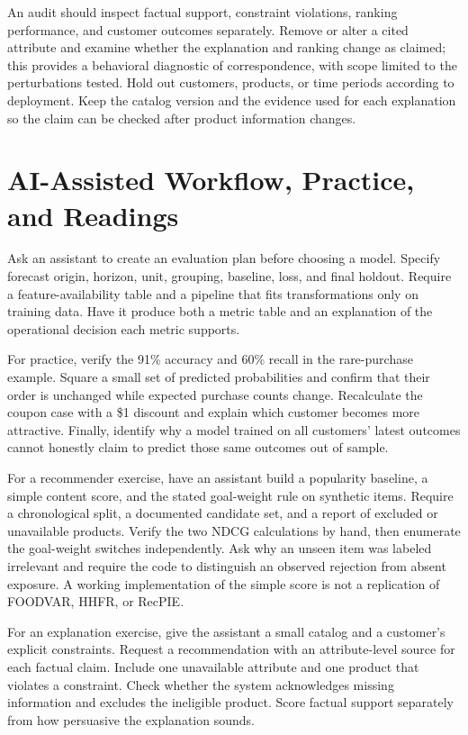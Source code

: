 An audit should inspect factual support, constraint violations, ranking
performance, and customer outcomes separately. Remove or alter a cited
attribute and examine whether the explanation and ranking change as
claimed; this provides a behavioral diagnostic of correspondence, with
scope limited to the perturbations tested. Hold out customers, products,
or time periods according to deployment. Keep the catalog version and
the evidence used for each explanation so the claim can be checked after
product information changes.

\hypertarget{M07-ai-assisted-workflow-practice-and-readings}{%
\section{AI-Assisted Workflow, Practice, and
Readings}\label{M07-ai-assisted-workflow-practice-and-readings}}

\noindent Ask an assistant to create an evaluation plan before choosing a model.
Specify forecast origin, horizon, unit, grouping, baseline, loss, and
final holdout. Require a feature-availability table and a pipeline that
fits transformations only on training data. Have it produce both a
metric table and an explanation of the operational decision each metric
supports.

For practice, verify the 91\% accuracy and 60\% recall in the
rare-purchase example. Square a small set of predicted probabilities and
confirm that their order is unchanged while expected purchase counts
change. Recalculate the coupon case with a \$1 discount and explain
which customer becomes more attractive. Finally, identify why a model
trained on all customers' latest outcomes cannot honestly claim to
predict those same outcomes out of sample.

For a recommender exercise, have an assistant build a popularity
baseline, a simple content score, and the stated goal-weight rule on
synthetic items. Require a chronological split, a documented candidate
set, and a report of excluded or unavailable products. Verify the two
NDCG calculations by hand, then enumerate the goal-weight switches
independently. Ask why an unseen item was labeled irrelevant and require
the code to distinguish an observed rejection from absent exposure. A
working implementation of the simple score is not a replication of
FOODVAR, HHFR, or RecPIE.

For an explanation exercise, give the assistant a small catalog and a
customer's explicit constraints. Request a recommendation with an
attribute-level source for each factual claim. Include one unavailable
attribute and one product that violates a constraint. Check whether the
system acknowledges missing information and excludes the ineligible
product. Score factual support separately from how persuasive the
explanation sounds.

